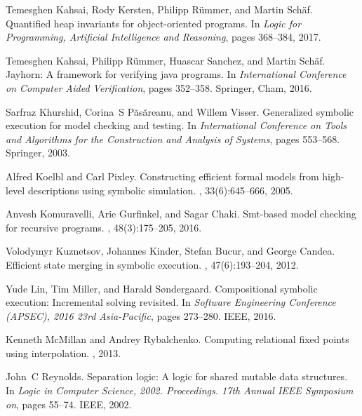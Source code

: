 \begin{thebibliography}{10}
Temesghen Kahsai, Rody Kersten, Philipp R{\"u}mmer, and Martin Sch{\"a}f.
\newblock Quantified heap invariants for object-oriented programs.
\newblock In {\em Logic for Programming, Artificial Intelligence and
  Reasoning}, pages 368--384, 2017.

Temesghen Kahsai, Philipp R{\"u}mmer, Huascar Sanchez, and Martin Sch{\"a}f.
\newblock Jayhorn: A framework for verifying java programs.
\newblock In {\em International Conference on Computer Aided Verification},
  pages 352--358. Springer, Cham, 2016.

Sarfraz Khurshid, Corina~S P{\u{a}}s{\u{a}}reanu, and Willem Visser.
\newblock Generalized symbolic execution for model checking and testing.
\newblock In {\em International Conference on Tools and Algorithms for the
  Construction and Analysis of Systems}, pages 553--568. Springer, 2003.

Alfred Koelbl and Carl Pixley.
\newblock Constructing efficient formal models from high-level descriptions
  using symbolic simulation.
, 33(6):645--666,
  2005.

Anvesh Komuravelli, Arie Gurfinkel, and Sagar Chaki.
\newblock Smt-based model checking for recursive programs.
, 48(3):175--205, 2016.

Volodymyr Kuznetsov, Johannes Kinder, Stefan Bucur, and George Candea.
\newblock Efficient state merging in symbolic execution.
, 47(6):193--204, 2012.

Yude Lin, Tim Miller, and Harald S{\o}ndergaard.
\newblock Compositional symbolic execution: Incremental solving revisited.
\newblock In {\em Software Engineering Conference (APSEC), 2016 23rd
  Asia-Pacific}, pages 273--280. IEEE, 2016.

Kenneth McMillan and Andrey Rybalchenko.
\newblock Computing relational fixed points using interpolation.
, 2013.

John~C Reynolds.
\newblock Separation logic: A logic for shared mutable data structures.
\newblock In {\em Logic in Computer Science, 2002. Proceedings. 17th Annual
  IEEE Symposium on}, pages 55--74. IEEE, 2002.


\end{thebibliography}
